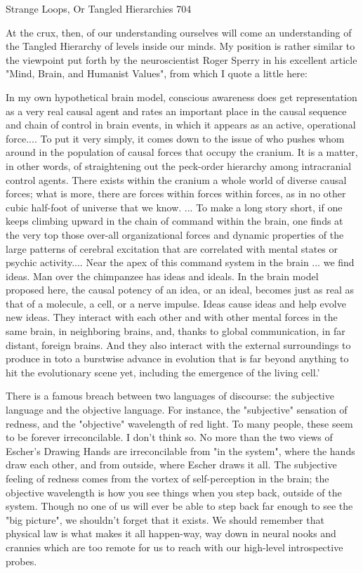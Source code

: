 Strange Loops, Or Tangled Hierarchies                                                    704

        At the crux, then, of our understanding ourselves will come an understanding of
the Tangled Hierarchy of levels inside our minds. My position is rather similar to the
viewpoint put forth by the neuroscientist Roger Sperry in his excellent article "Mind,
Brain, and Humanist Values", from which I quote a little here:

   In my own hypothetical brain model, conscious awareness does get representation
   as a very real causal agent and rates an important place in the causal sequence and
   chain of control in brain events, in which it appears as an active, operational
   force.... To put it very simply, it comes down to the issue of who pushes whom
   around in the population of causal forces that occupy the cranium. It is a matter, in
   other words, of straightening out the peck-order hierarchy among intracranial
   control agents. There exists within the cranium a whole world of diverse causal
   forces; what is more, there are forces within forces within forces, as in no other
   cubic half-foot of universe that we know. ... To make a long story short, if one
   keeps climbing upward in the chain of command within the brain, one finds at the
   very top those over-all organizational forces and dynamic properties of the large
   patterns of cerebral excitation that are correlated with mental states or psychic
   activity.... Near the apex of this command system in the brain ... we find ideas. Man
   over the chimpanzee has ideas and ideals. In the brain model proposed here, the
   causal potency of an idea, or an ideal, becomes just as real as that of a molecule, a
   cell, or a nerve impulse. Ideas cause ideas and help evolve new ideas. They interact
   with each other and with other mental forces in the same brain, in neighboring
   brains, and, thanks to global communication, in far distant, foreign brains. And they
   also interact with the external surroundings to produce in toto a burstwise advance
   in evolution that is far beyond anything to hit the evolutionary scene yet, including
   the emergence of the living cell.'

        There is a famous breach between two languages of discourse: the subjective
language and the objective language. For instance, the "subjective" sensation of redness,
and the "objective" wavelength of red light. To many people, these seem to be forever
irreconcilable. I don't think so. No more than the two views of Escher's Drawing Hands
are irreconcilable from "in the system", where the hands draw each other, and from
outside, where Escher draws it all. The subjective feeling of redness comes from the
vortex of self-perception in the brain; the objective wavelength is how you see things
when you step back, outside of the system. Though no one of us will ever be able to step
back far enough to see the "big picture", we shouldn't forget that it exists. We should
remember that physical law is what makes it all happen-way, way down in neural nooks
and crannies which are too remote for us to reach with our high-level introspective
probes.

